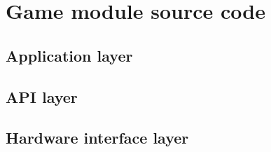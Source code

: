 \section{Game module source code}

\subsection{Application layer}




















\subsection{API layer}



















\subsection{Hardware interface layer}











